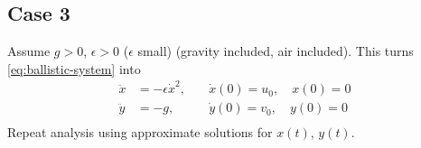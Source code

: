 \documentclass[12pt]{article}
\begin{document}
\subsection{Case 3}
Assume $g>0$, $\epsilon>0$ ($\epsilon$ small) (gravity included, air included).
This turns \cref{eq:ballistic-system} into
\begin{equation*}
  \begin{aligned}
    \ddot{x}&=-\epsilon\dot{x}^2, &\quad \dot{x}(0)=u_0,\quad x(0)=0 \\
    \ddot{y}&=-g, &\quad \dot{y}(0)=v_0,\quad y(0)=0 \\
  \end{aligned}
\end{equation*}
Repeat analysis using approximate solutions for $x(t)$, $y(t)$.
\end{document}
